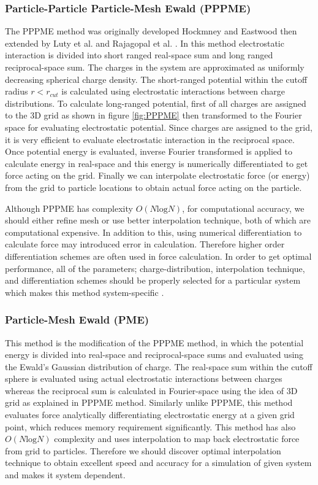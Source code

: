\subsubsection{Particle-Particle Particle-Mesh Ewald (PPPME)}
\label{subsec:PPPME}
The PPPME method was originally developed Hockmney and Eastwood \cite{Hockney88} then extended  by Luty et al.\cite{Luty94} and Rajagopal et al. \cite{Rajagopal94}. In this method electrostatic interaction is divided into short ranged real-space sum and long ranged reciprocal-space sum. The charges in the system are approximated as uniformly decreasing spherical charge density. The short-ranged potential within the cutoff radius $r < r_{cut}$ is calculated using electrostatic interactions between charge distributions. To calculate long-ranged potential, first of all charges are assigned to the 3D grid as shown in figure \ref{fig:PPPME} then transformed to the Fourier space for evaluating electrostatic potential. Since charges are assigned to the grid, it is very efficient to evaluate electrostatic interaction in the reciprocal space. Once potential energy is evaluated, inverse Fourier transformed is applied to calculate energy in real-space and this energy is numerically differentiated to get force acting on the grid. Finally we can interpolate electrostatic force (or energy) from the grid to particle locations to obtain actual force acting on the particle.

Although PPPME has complexity $O(N \mathrm{log}N)$, for computational accuracy, we should either refine mesh or use better interpolation technique, both of which are computational expensive. In addition to this, using numerical differentiation to calculate force may introduced error in calculation. Therefore higher order differentiation schemes are often used in force calculation. In order to get optimal performance, all of the parameters; charge-distribution, interpolation technique, and differentiation schemes should be properly selected for a particular system which makes this method system-specific \cite{Toukomaji96}.

\subsubsection{Particle-Mesh Ewald (PME)}
\label{subsubsec:PME}
This method is the modification of the PPPME method, in which the potential energy is divided into real-space and reciprocal-space sums and evaluated using the Ewald's Gaussian distribution of charge. The real-space sum within the cutoff sphere is evaluated using actual electrostatic interactions between charges whereas the reciprocal sum is calculated in Fourier-space using the idea of 3D grid as explained in PPPME method. Similarly unlike PPPME, this method evaluates force analytically differentiating electrostatic energy at a given grid point, which reduces memory requirement significantly. This method has also $O(N \mathrm{log}N)$ complexity and uses interpolation to map back electrostatic force from grid to particles. Therefore we should discover optimal interpolation technique to obtain excellent speed and accuracy for a simulation of given system and makes it system dependent.

